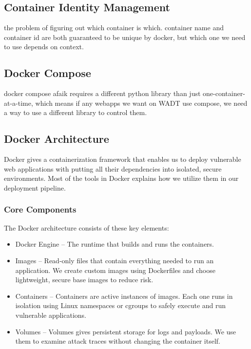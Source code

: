 \documentclass[12pt]{article}
\begin{document}
\subsection{Container Identity Management} \label{subsec:container-identity-management}
the problem of figuring out which container is which. container name and container id are both guaranteed to be unique by docker, but which one we need to use depends on context.

\subsection{Docker Compose}
docker compose afaik requires a different python library than just
one-container-at-a-time, which means if any webapps we want on WADT
use compose, we need a way to use a different library to control them.

\subsection{Docker Architecture}
Docker gives a containerization framework that enables us to deploy vulnerable web applications with putting all their dependencies into isolated, secure environments. Most of the tools in Docker explains how we utilize them in our deployment pipeline.

\subsubsection{Core Components}
The Docker architecture consists of these key elements:
  \begin{itemize}
    \item {Docker Engine} – The runtime that builds and runs the containers.
    \item {Images} – Read-only files that contain everything needed to run an application. We create custom images using Dockerfiles and choose lightweight, secure base images to reduce risk.
    \item {Containers} – Containers are active instances of images. Each one runs in isolation using Linux namespaces or cgroups to safely execute and run vulnerable applications.
    \item {Volumes} – Volumes gives persistent storage for logs and payloads. We use them to examine attack traces without changing the container itself.
    \end{itemize}
\end{document}
